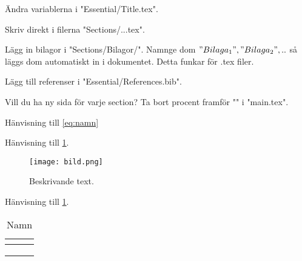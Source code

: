 
Ändra variablerna i "Essential/Title.tex".

Skriv direkt i filerna "Sections/...tex".

Lägg in bilagor i "Sections/Bilagor/".
Namnge dom $"Bilaga_1", "Bilaga_2",..$ så läggs dom automatiskt in i dokumentet.
Detta funkar för .tex filer.

Lägg till referenser i "Essential/References.bib".

Vill du ha ny sida för varje section? Ta bort procent framför "\newpage" i "main.tex".



Hänvisning till \cref{eq:namn}
\begin{equation} \label{eq:namn}
\end{equation}


Hänvisning till \cref{fig:namn}.
\begin{figure} [H]
    \centering 
    \texttt{[image: bild.png]}
    \caption{Beskrivande text.}
    \label{fig:namn}
\end{figure}


Hänvisning till \cref{tab:namn}.
\begin{table}[H]
\centering
\caption{Namn} \label{tab:namn}
\begin{tabular}{ l l l } \toprule
\textbf{} & \textbf{} & \textbf{} \\
\midrule
     &  &  \\
     &  &  \\
     &  &  \\
\bottomrule
\end{tabular}
\end{table}



